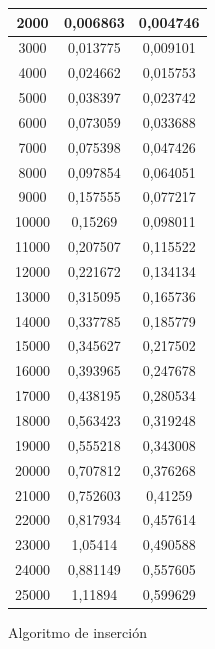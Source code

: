 \documentclass[12pt,spanish]{article}
\begin{document}
\begin{figure}[H]
\begin{tabular}{|c|c|c|}
\hline
2000  & 0,006863 & 0,004746\\
\hline
3000  & 0,013775 & 0,009101\\
\hline
4000  & 0,024662 & 0,015753\\
\hline
5000  & 0,038397 & 0,023742\\
\hline
6000  & 0,073059 & 0,033688\\
\hline
7000  & 0,075398 & 0,047426\\
\hline
8000  & 0,097854 & 0,064051\\
\hline
9000  & 0,157555 & 0,077217\\
\hline
10000 & 0,15269  & 0,098011\\
\hline
11000 & 0,207507 &  0,115522\\
\hline
12000 & 0,221672 &  0,134134\\
\hline
13000 & 0,315095 &  0,165736\\
\hline
14000 & 0,337785 & 0,185779\\
\hline
15000 & 0,345627 & 0,217502\\
\hline
16000 & 0,393965 & 0,247678\\
\hline
17000 & 0,438195 & 0,280534\\
\hline
18000 & 0,563423 & 0,319248\\
\hline
19000 & 0,555218 & 0,343008\\
\hline
20000 & 0,707812 & 0,376268\\
\hline
21000 & 0,752603 & 0,41259\\
\hline
22000 & 0,817934 & 0,457614\\
\hline
23000 & 1,05414  & 0,490588\\
\hline
24000 & 0,881149 & 0,557605\\
\hline
25000 & 1,11894  & 0,599629\\
\hline
\end{tabular}
\caption{Algoritmo de inserción}
\end{figure}
\end{document}
